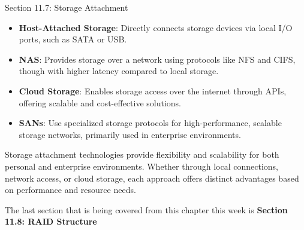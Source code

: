 \begin{notes}{Section 11.7: Storage Attachment}
\begin{highlight}
    \end{highlight}
    
    \begin{highlight}
    
        \begin{itemize}
            \item \textbf{Host-Attached Storage}: Directly connects storage devices via local I/O ports, such as SATA or USB.
            \item \textbf{NAS}: Provides storage over a network using protocols like NFS and CIFS, though with higher latency compared to local storage.
            \item \textbf{Cloud Storage}: Enables storage access over the internet through APIs, offering scalable and cost-effective solutions.
            \item \textbf{SANs}: Use specialized storage protocols for high-performance, scalable storage networks, primarily used in enterprise environments.
        \end{itemize}
    
    Storage attachment technologies provide flexibility and scalability for both personal and enterprise environments. Whether through local connections, network access, or cloud storage, each 
    approach offers distinct advantages based on performance and resource needs.
    
    \end{highlight}

\end{notes}

The last section that is being covered from this chapter this week is \textbf{Section 11.8: RAID Structure}


